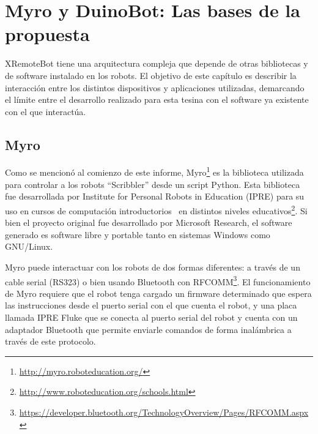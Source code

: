 \chapter{Myro y DuinoBot: Las bases de la propuesta}\label{cha:myro_y_duinobot}




XRemoteBot tiene una arquitectura compleja que
depende de otras bibliotecas y de software instalado en los robots.
El objetivo de este capítulo es describir la interacción entre los
distintos dispositivos y aplicaciones utilizadas, demarcando el límite
entre el desarrollo realizado para esta tesina con el software ya
existente con el que interactúa.

\section{Myro}\label{sec:myro}

Como se mencionó al comienzo de este informe,
Myro\footnote{\url{http://myro.roboteducation.org/}}
es la biblioteca utilizada para controlar a los robots
``Scribbler''
desde un script Python. Esta biblioteca fue desarrollada por
Institute for Personal Robots in Education (IPRE)
para su uso en cursos de computación introductorios~\citep{kumar_2009}
en distintos niveles
educativos\footnote{\url{http://www.roboteducation.org/schools.html}}.
Si bien el proyecto original fue desarrollado por Microsoft Research,
el software generado es software libre y portable tanto en sistemas Windows
como GNU/Linux.

Myro puede interactuar con los robots de dos
formas diferentes: a través de un cable serial (RS323) o bien usando Bluetooth
con RFCOMM\footnote{\url{https://developer.bluetooth.org/TechnologyOverview/Pages/RFCOMM.aspx}}.
El funcionamiento de Myro requiere que el robot tenga
cargado un firmware determinado que espera las instrucciones desde el puerto
serial con el que cuenta el robot, y una placa llamada IPRE Fluke que se conecta
al puerto serial del robot y cuenta con un adaptador Bluetooth que permite
enviarle comandos de forma inalámbrica a través de este protocolo.

